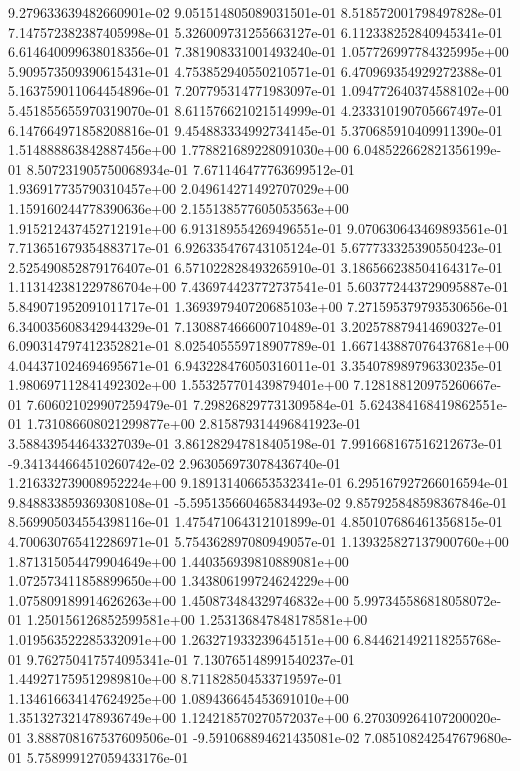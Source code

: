 9.279633639482660901e-02
9.051514805089031501e-01
8.518572001798497828e-01
7.147572382387405998e-01
5.326009731255663127e-01
6.112338252840945341e-01
6.614640099638018356e-01
7.381908331001493240e-01
1.057726997784325995e+00
5.909573509390615431e-01
4.753852940550210571e-01
6.470969354929272388e-01
5.163759011064454896e-01
7.207795314771983097e-01
1.094772640374588102e+00
5.451855655970319070e-01
8.611576621021514999e-01
4.233310190705667497e-01
6.147664971858208816e-01
9.454883334992734145e-01
5.370685910409911390e-01
1.514888863842887456e+00
1.778821689228091030e+00
6.048522662821356199e-01
8.507231905750068934e-01
7.671146477763699512e-01
1.936917735790310457e+00
2.049614271492707029e+00
1.159160244778390636e+00
2.155138577605053563e+00
1.915212437452712191e+00
6.913189554269496551e-01
9.070630643469893561e-01
7.713651679354883717e-01
6.926335476743105124e-01
5.677733325390550423e-01
2.525490852879176407e-01
6.571022828493265910e-01
3.186566238504164317e-01
1.113142381229786704e+00
7.436974423772737541e-01
5.603772443729095887e-01
5.849071952091011717e-01
1.369397940720685103e+00
7.271595379793530656e-01
6.340035608342944329e-01
7.130887466600710489e-01
3.202578879414690327e-01
6.090314797412352821e-01
8.025405559718907789e-01
1.667143887076437681e+00
4.044371024694695671e-01
6.943228476050316011e-01
3.354078989796330235e-01
1.980697112841492302e+00
1.553257701439879401e+00
7.128188120975260667e-01
7.606021029907259479e-01
7.298268297731309584e-01
5.624384168419862551e-01
1.731086608021299877e+00
2.815879314496841923e-01
3.588439544643327039e-01
3.861282947818405198e-01
7.991668167516212673e-01
-9.341344664510260742e-02
2.963056973078436740e-01
1.216332739008952224e+00
9.189131406653532341e-01
6.295167927266016594e-01
9.848833859369308108e-01
-5.595135660465834493e-02
9.857925848598367846e-01
8.569905034554398116e-01
1.475471064312101899e-01
4.850107686461356815e-01
4.700630765412286971e-01
5.754362897080949057e-01
1.139325827137900760e+00
1.871315054479904649e+00
1.440356939810889081e+00
1.072573411858899650e+00
1.343806199724624229e+00
1.075809189914626263e+00
1.450873484329746832e+00
5.997345586818058072e-01
1.250156126852599581e+00
1.253136847848178581e+00
1.019563522285332091e+00
1.263271933239645151e+00
6.844621492118255768e-01
9.762750417574095341e-01
7.130765148991540237e-01
1.449271759512989810e+00
8.711828504533719597e-01
1.134616634147624925e+00
1.089436645453691010e+00
1.351327321478936749e+00
1.124218570270572037e+00
6.270309264107200020e-01
3.888708167537609506e-01
-9.591068894621435081e-02
7.085108242547679680e-01
5.758999127059433176e-01
